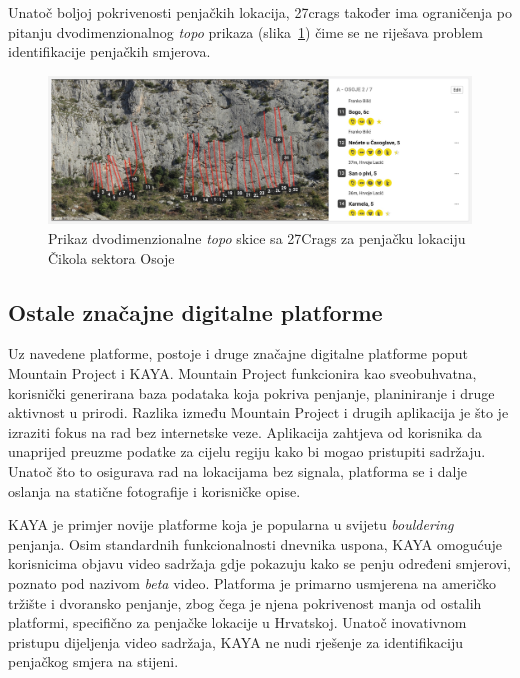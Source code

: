 Unatoč boljoj pokrivenosti penjačkih lokacija, 27crags također ima ograničenja po pitanju dvodimenzionalnog \textit{topo} prikaza (slika~\ref{fig:cikola_27crags_topo}) čime se ne riješava problem identifikacije penjačkih smjerova.

\begin{figure}[H]
    \centering
    \includegraphics[width=1\textwidth]{images/analiza/cikola_27crags_topo.jpeg}
    \caption{Prikaz dvodimenzionalne \textit{topo} skice sa 27Crags za penjačku lokaciju Čikola sektora Osoje}
    \label{fig:cikola_27crags_topo}
\end{figure}

\subsection{Ostale značajne digitalne platforme}

Uz navedene platforme, postoje i druge značajne digitalne platforme poput Mountain Project i KAYA. Mountain Project funkcionira kao sveobuhvatna, korisnički generirana baza podataka koja pokriva penjanje, planiniranje i druge aktivnost u prirodi. Razlika između Mountain Project i drugih aplikacija je što je izraziti fokus na rad bez internetske veze. Aplikacija zahtjeva od korisnika da unaprijed preuzme podatke za cijelu regiju kako bi mogao pristupiti sadržaju. Unatoč što to osigurava rad na lokacijama bez signala, platforma se i dalje oslanja na statične fotografije i korisničke opise.

KAYA je primjer novije platforme koja je popularna u svijetu \textit{bouldering} penjanja. Osim standardnih funkcionalnosti dnevnika uspona, KAYA omogućuje korisnicima objavu video sadržaja gdje pokazuju kako se penju određeni smjerovi, poznato pod nazivom \textit{beta} video.  Platforma je primarno usmjerena na američko tržište i dvoransko penjanje, zbog čega je njena pokrivenost manja od ostalih platformi, specifično za penjačke lokacije u Hrvatskoj. Unatoč inovativnom pristupu dijeljenja video sadržaja, KAYA ne nudi rješenje za identifikaciju penjačkog smjera na stijeni.


